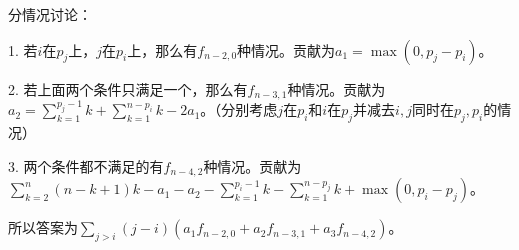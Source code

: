 \documentclass{article}
\begin{document}
分情况讨论：

1. 若$i$在$p_j$上，$j$在$p_i$上，那么有$f_{n-2,0}$种情况。贡献为$a_1=\max(0,p_j-p_i)$。

2. 若上面两个条件只满足一个，那么有$f_{n-3,1}$种情况。贡献为$a_2=\sum\limits_{k=1}^{p_j-1}k+\sum\limits_{k=1}^{n-p_i}k-2a_1$。（分别考虑$j$在$p_i$和$i$在$p_j$并减去$i,j$同时在$p_j,p_i$的情况）

3. 两个条件都不满足的有$f_{n-4,2}$种情况。贡献为$\sum\limits_{k=2}^n (n-k+1)k - a_1 - a_2 - \sum\limits_{k=1}^{p_i-1}k-\sum\limits_{k=1}^{n-p_j}k+\max(0,p_i-p_j)$。

所以答案为$\sum\limits_{j>i}(j-i)(a_1 f_{n-2,0} + a_2f_{n-3,1} + a_3 f_{n-4,2})$。
\end{document}
